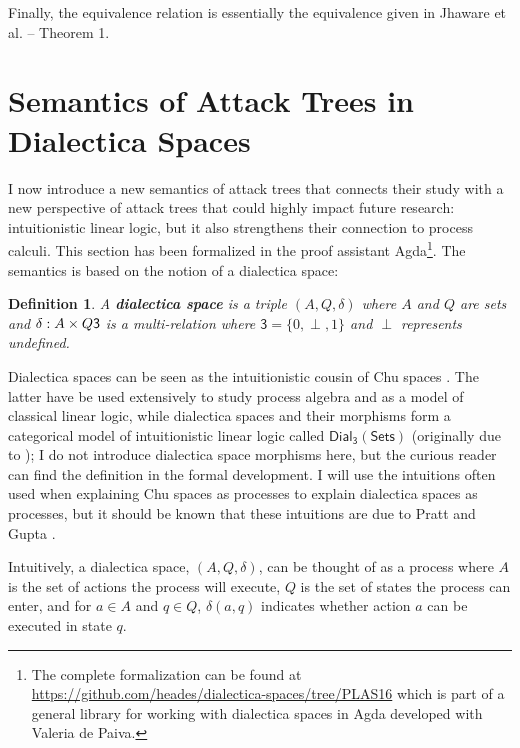 \documentclass{sigplanconf}
\let\to\relax
\newcommand{\to}{\rightarrow}
\newcommand{\dial}[0]{\mathsf{Dial_3}(\mathsf{Sets})}
\newtheorem{definition}[theorem]{Definition}
\begin{document}
Finally, the equivalence relation is essentially the equivalence given
in Jhaware et al. \cite{Jhawar:2015} -- Theorem 1.

\section{Semantics of Attack Trees in Dialectica Spaces}
\label{sec:concrete_semantics_of_attack_trees_in_dialectica_spaces}

I now introduce a new semantics of attack trees that connects their
study with a new perspective of attack trees that could highly impact
future research: intuitionistic linear logic, but it also strengthens
their connection to process calculi.  This section has been formalized
in the proof assistant Agda\footnote{The complete formalization can be
  found at
  \url{https://github.com/heades/dialectica-spaces/tree/PLAS16}
  which is part of a general library for working with dialectica
  spaces in Agda developed with Valeria de Paiva.}.  The semantics is
based on the notion of a dialectica space:

\begin{definition}
  \label{def:dialectica-space}
  A \textbf{dialectica space} is a triple $(A, Q, \delta)$ where $A$
  and $Q$ are sets and $\delta : A \times Q \to \mathsf{3}$ is a
  multi-relation where $\mathsf{3} = \{0,\perp,1\}$ and $\perp$
  represents undefined.
\end{definition}

Dialectica spaces can be seen as the intuitionistic cousin
\cite{dePaiva:2006b} of Chu spaces \cite{Pratt:1999}.  The latter have
be used extensively to study process algebra and as a model of
classical linear logic, while dialectica spaces and their morphisms
form a categorical model of intuitionistic linear logic called $\dial$
(originally due to \cite{dePaiva:1987}); I do not introduce
dialectica space morphisms here, but the curious reader can find the
definition in the formal development. I will use the intuitions often
used when explaining Chu spaces as processes to explain dialectica
spaces as processes, but it should be known that these intuitions are
due to Pratt and Gupta \cite{Gupta:1994}.

Intuitively, a dialectica space, $(A , Q, \delta)$, can be thought of
as a process where $A$ is the set of actions the process will execute,
$Q$ is the set of states the process can enter, and for $a \in A$ and
$q \in Q$, $\delta(a , q)$ indicates whether action $a$ can be
executed in state $q$.
\end{document}
